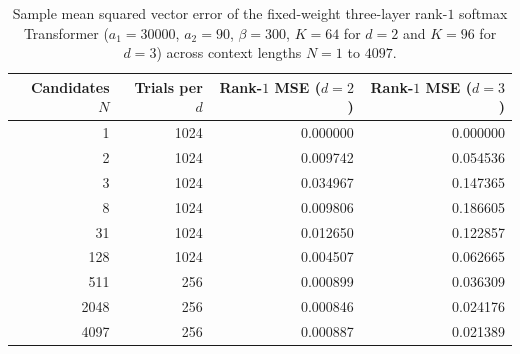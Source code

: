 \documentclass[11pt]{article}
\theoremstyle{plain}
\theoremstyle{definition}
\theoremstyle{remark}
\begin{document}
\begin{table}[ht]
\centering
\small
\begin{tabular}{@{}rrrr@{}}
\toprule
Candidates $N$ & Trials per $d$ & Rank-$1$ MSE ($d=2$) & Rank-$1$ MSE ($d=3$) \\
\midrule
1    & 1024 & 0.000000 & 0.000000 \\
2    & 1024 & 0.009742 & 0.054536 \\
3    & 1024 & 0.034967 & 0.147365 \\
8    & 1024 & 0.009806 & 0.186605 \\
31   & 1024 & 0.012650 & 0.122857 \\
128  & 1024 & 0.004507 & 0.062665 \\
511  & 256  & 0.000899 & 0.036309 \\
2048 & 256  & 0.000846 & 0.024176 \\
4097 & 256  & 0.000887 & 0.021389 \\
\bottomrule
\end{tabular}
\caption{Sample mean squared vector error of the fixed-weight three-layer rank-$1$ softmax Transformer ($a_1 = 30000$, $a_2 = 90$, $\beta = 300$, $K = 64$ for $d = 2$ and $K = 96$ for $d = 3$) across context lengths $N = 1$ to $4097$.}
\label{tab:mse}
\end{table}
\end{document}
